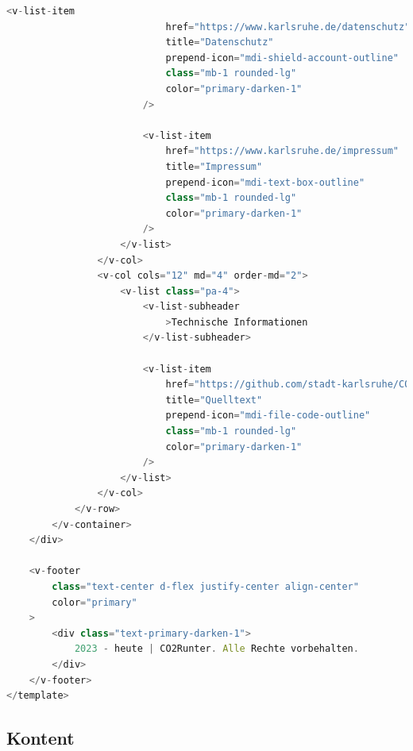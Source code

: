 \begin{lstlisting}[language={JavaScript}, caption={Footer Definition}]
                        <v-list-item
                            href="https://www.karlsruhe.de/datenschutz"
                            title="Datenschutz"
                            prepend-icon="mdi-shield-account-outline"
                            class="mb-1 rounded-lg"
                            color="primary-darken-1"
                        />

                        <v-list-item
                            href="https://www.karlsruhe.de/impressum"
                            title="Impressum"
                            prepend-icon="mdi-text-box-outline"
                            class="mb-1 rounded-lg"
                            color="primary-darken-1"
                        />
                    </v-list>
                </v-col>
                <v-col cols="12" md="4" order-md="2">
                    <v-list class="pa-4">
                        <v-list-subheader
                            >Technische Informationen
                        </v-list-subheader>

                        <v-list-item
                            href="https://github.com/stadt-karlsruhe/CO2-Runter"
                            title="Quelltext"
                            prepend-icon="mdi-file-code-outline"
                            class="mb-1 rounded-lg"
                            color="primary-darken-1"
                        />
                    </v-list>
                </v-col>
            </v-row>
        </v-container>
    </div>

    <v-footer
        class="text-center d-flex justify-center align-center"
        color="primary"
    >
        <div class="text-primary-darken-1">
            2023 - heute | CO2Runter. Alle Rechte vorbehalten.
        </div>
    </v-footer>
</template>
\end{lstlisting}

\subsection{Kontent}



